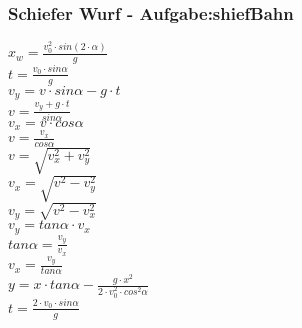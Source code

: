 \subsubsection{Schiefer Wurf  - Aufgabe:shiefBahn} 
\begin{minipage}{0.45\textwidth} 
$ x_{w}  = \frac{v_{0} ^{2} \cdot sin(2\cdot \alpha )}{       g} $\\ 
$ t =\frac{v_{0} \cdot sin \alpha }{  g} $\\ 
$ v_{y}  =  v\cdot sin\alpha - g\cdot t $\\ 
$ v= \frac{ v_{y} +g\cdot t}{ sin\alpha } $\\ 
$ v_{x}  = v\cdot  cos\alpha $\\ 
$ v= \frac{ v_{x} }{ cos\alpha } $\\ 
$ v= \sqrt{ v_{x} ^{2} + v_{y} ^{2} } $\\ 
$ v_{x} = \sqrt{ v^{2}  - v_{y} ^{2} } $\\ 
$ v_{y} = \sqrt{ v^{2}  - v_{x} ^{2} } $\\ 
$ v_{y} = tan \alpha \cdot  v_{x} $\\ 
$ tan \alpha = \frac{v_{y} }{v_{x} } $\\ 
$ v_{x} = \frac{v_{y} }{tan \alpha } $\\ 
$ y = x\cdot tan \alpha  - \frac{   g\cdot x^{2} }{2\cdot v^{2} _{0} \cdot cos ^{2}\alpha } $\\ 
$ t =\frac{2\cdot v_{0} \cdot sin \alpha }{ g} $\\ 
\end{minipage} 
\begin{minipage}{0.45\textwidth} 
 
\end{minipage} 
